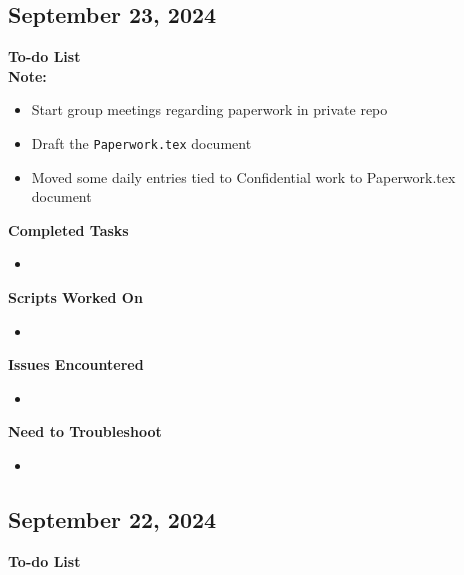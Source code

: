 \documentclass[11pt]{report}
\newcommand{\done}{\checkmark}
\begin{document}
{\newpage

\begin{multicols}{2}
\section{September 23, 2024}


\textbf{To-do List} \\
\textbf{Note:} 

\begin{itemize}
	\item [\done] Start group meetings regarding paperwork in private repo
	\item [\done] Draft the \texttt{Paperwork.tex} document
	\item [\done] Moved some daily entries tied to Confidential work to Paperwork.tex document

		
\end{itemize}

\textbf{Completed Tasks}
\begin{itemize}
	\item 
\end{itemize}

\textbf{Scripts Worked On}
\begin{itemize}
	\item 
\end{itemize}


\textbf{Issues Encountered}
\begin{itemize}
	\item 
\end{itemize}

\textbf{Need to Troubleshoot}
\begin{itemize}
	\item 
\end{itemize}
\end{multicols}


\newpage

\begin{multicols}{2}
\section{September 22, 2024}
\textbf{To-do List} \\



\end{multicols}}
\end{document}
